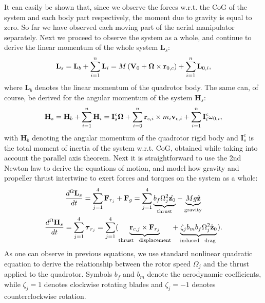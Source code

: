 It can easily be shown that, since we observe the forces w.r.t. the CoG of the system and each body part respectively, the moment due to gravity is equal to zero. So far we have observed each moving part of the aerial manipulator separately. Next we proceed to observe the system as a whole, and continue to derive the linear momentum of the whole system $\textbf{L}_s$:
\begin{equation}
\textbf{L}_s = \textbf{L}_{b} + \sum_{i=1}^n \textbf{L}_{i}= M \left( \textbf{V}_{0} + \boldsymbol{\Omega} \times \textbf{r}_{0,c}  \right) + \sum_{i=1}^n \textbf{L}_{0,i},
\end{equation} 
where $\textbf{L}_{b}$ denotes the linear momentum of the quadrotor body. The same can, of course, be derived for the angular momentum of the system $\textbf{H}_s$:
\begin{equation}
\textbf{H}_s = \textbf{H}_b +  \sum_{i=1}^n\textbf{H}_i = \textbf{I}_s^{c} \boldsymbol{\Omega} + \sum_{i=0}^n  \textbf{r}_{c,i} \times m_i \textbf{v}_{c,i}+\sum_{i=1}^n\textbf{I}_i^c\omega_{0,i} ,
\end{equation}
with $\textbf{H}_b$ denoting the angular momentum of the quadrotor rigid body and $\textbf{I}_s^{c}$ is the total moment of inertia of the system w.r.t. CoG, obtained while taking into account the parallel axis theorem. Next it is straightforward to use the 2nd Newton law to derive the equations of motion, and model how gravity and propeller thrust intertwine to exert forces and torques on the system as a whole: 
\begin{gather}
\frac{d^{\Omega} \textbf{L}_s}{dt} = \sum_{j=1}^4 \textbf{F}_{r_j} + \textbf{F}_g = \sum_{j=1}^4 \underset{\textup{thrust}}{\underbrace{ b_f \Omega_{j}^2 \hat{\textbf{z}_0}}} - \underset{\textup{gravity}}{\underbrace{M g \hat{\textbf{z}}}} \\ \nonumber
\frac{d^{\Omega} \textbf{H}_s}{dt} =  \sum_{j=1}^4 \boldsymbol{\tau}_{r_j}=\sum_{j=1}^4 (\underset{\textup{thrust \: displacement}}{\underbrace{\textbf{r}_{c,j} \times \textbf{F}_{r_j}}} + \underset{\textup{induced \: drag }}{\underbrace{ \zeta_j b_m b_f \Omega_j^2 \hat{\textbf{z}}_0}}).
\end{gather}
As one can observe in previous equations, we use standard nonlinear quadratic equation to derive the relationship between the rotor speed $\Omega_j$ and the thrust applied to the quadrotor. Symbols $b_f$ and $b_m$ denote the aerodynamic coefficients, while $\zeta_j=1$ denotes clockwise rotating blades and $\zeta_j=-1$ denotes counterclockwise rotation.

